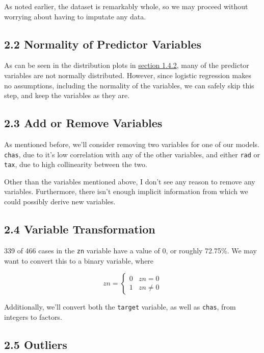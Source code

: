 \documentclass[]{article}
\begin{document}
As noted earlier, the dataset is remarkably whole, so we may proceed
without worrying about having to imputate any data.

\subsection{2.2 Normality of Predictor
Variables}\label{normality-of-predictor-variables}

As can be seen in the distribution plots in
\protect\hyperlink{histogram}{section 1.4.2}, many of the predictor
variables are not normally distributed. However, since logistic
regression makes no assumptions, including the normality of the
variables, we can safely skip this step, and keep the variables as they
are.

\subsection{2.3 Add or Remove Variables}\label{add-or-remove-variables}

As mentioned before, we'll consider removing two variables for one of
our models. \texttt{chas}, due to it's low correlation with any of the
other variables, and either \texttt{rad} or \texttt{tax}, due to high
collinearity between the two.

Other than the variables mentioned above, I don't see any reason to
remove any variables. Furthermore, there isn't enough implicit
information from which we could possibly derive new variables.

\hypertarget{variable-transformation}{\subsection{2.4 Variable
Transformation}\label{variable-transformation}}

339 of 466 cases in the \texttt{zn} variable have a value of 0, or
roughly 72.75\%. We may want to convert this to a binary variable, where

\[ zn = 
\begin{cases} 
      0 & zn = 0 \\
      1 & zn \neq 0
\end{cases}
\]

Additionally, we'll convert both the \texttt{target} variable, as well
as \texttt{chas}, from integers to factors.

\subsection{2.5 Outliers}\label{outliers}
\end{document}
